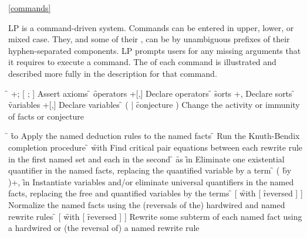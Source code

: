 \ref{commands}

LP is a command-driven system.  Commands can be entered in upper, lower, or
mixed case.  They, and some of their
, can be
 by unambiguous prefixes of their
hyphen-separated components.  LP prompts users for any missing arguments that
it requires to execute a command.  The  of
each command is illustrated and described more fully in the description for
that command.

\begin{description}
\dt \f{} +; [ ; ]
\dd Assert axioms
\dt \f{} \f{operators} +[,]
\dd Declare operators
\dt \f{} \f{sorts} +,
\dd Declare sorts
\dt \f{} \f{variables} +[,]
\dd Declare variables
\dt \f{}  (  | \f{conjecture} )
\dd Change the activity or immunity of facts or conjecture
\end{description}

\begin{description}
\dt \f{}  \f{to} 
\dd Apply the named deduction rules to the named facts
\dt \f{}
\dd Run the Knuth-Bendix completion procedure
\dt \f{}  \f{with} 
\dd Find critical pair equations between each rewrite rule in the first named
    set and each in the second
\dt \f{}  \f{as}  \f{in}
\dd Eliminate one existential quantifier in the named facts, replacing 
    the quantified variable by a term
\dt \f{} (  \f{by}  )+, 
     \f{in} 
\dd Instantiate variables and/or eliminate universal quantifiers in the named
    facts, replacing the free and quantified variables by the terms
\dt \f{}  
      [ \f{with} [ \f{reversed} ]  ]
\dd Normalize the named facts using the (reversals of the) hardwired and named 
    rewrite rules
\dt \f{} 
      [ \f{with} [ \f{reversed} ]  ]
\dd Rewrite some subterm of each named
     fact using a hardwired or (the reversal of) a named rewrite rule
\end{description}


